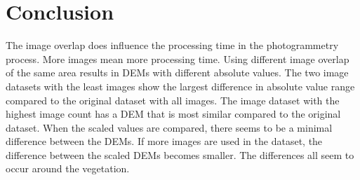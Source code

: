 \documentclass{isprs} %
\begin{document}
\section{Conclusion}
The image overlap does influence the processing time in the photogrammetry process. 
More images mean more processing time.
Using different image overlap of the same area results in DEMs with different absolute values.
The two image datasets with the least images show the largest difference in absolute value range compared to the original dataset with all images.
The image dataset with the highest image count has a DEM that is most similar compared to the original dataset.
When the scaled values are compared, there seems to be a minimal difference between the DEMs.
If more images are used in the dataset, the difference between the scaled DEMs becomes smaller.
The differences all seem to occur around the vegetation.


\sloppy




{
	\begin{spacing}{1.17}
		\normalsize
	\end{spacing}
}



\vspace{1cm}
\end{document}

